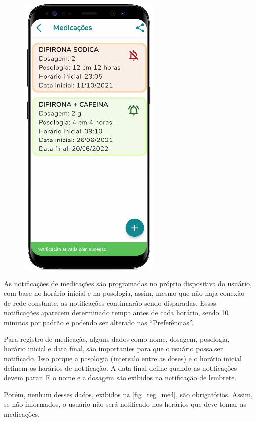 \begin{figure}[htb]
\begin{minipage}{0.45\textwidth}
        \includegraphics[scale=0.66]{Imagens/desenvolvimento/app/list_med_not.png}
    \end{minipage}
\end{figure}

As notificações de medicações são programadas no próprio dispositivo do usuário, com base no horário inicial e na posologia,
assim, mesmo que não haja conexão de rede constante, as notificações continuarão sendo disparadas. Essas notificações
aparecem determinado tempo antes de cada horário, sendo 10 minutos por padrão e podendo ser alterado nas “Preferências”.

Para registro de medicação, alguns dados como nome, dosagem, posologia, horário inicial e data final,
são importantes para que o usuário possa ser notificado. Isso porque a posologia (intervalo entre as doses)
e o horário inicial definem os horários de notificação. A data final define quando as notificações devem
parar. E o nome e a dosagem são exibidos na notificação de lembrete.

Porém, nenhum desses dados, exibidos na \autoref{fig_reg_med}, são obrigatórios. Assim, se não informados,
o usuário não será notificado nos horários que deve tomar as medicações.

